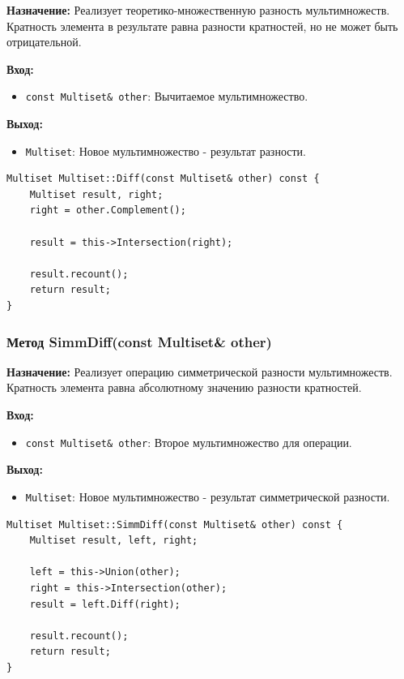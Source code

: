 \textbf{Назначение:} Реализует теоретико-множественную разность мультимножеств. Кратность элемента в результате равна разности кратностей, но не может быть отрицательной.

\textbf{Вход:}
\begin{itemize}
    \item \texttt{const Multiset\& other}: Вычитаемое мультимножество.
\end{itemize}

\textbf{Выход:}
\begin{itemize}
    \item \texttt{Multiset}: Новое мультимножество - результат разности.
\end{itemize}

\begin{lstlisting}[style=cstyle, caption={Реализация Diff()}]
Multiset Multiset::Diff(const Multiset& other) const {
    Multiset result, right;
	right = other.Complement();

	result = this->Intersection(right);

    result.recount();
    return result;
}
\end{lstlisting}

\subsubsection{Метод SimmDiff(const Multiset\& other)}

\textbf{Назначение:} Реализует операцию симметрической разности мультимножеств. Кратность элемента равна абсолютному значению разности кратностей.

\textbf{Вход:}
\begin{itemize}
    \item \texttt{const Multiset\& other}: Второе мультимножество для операции.
\end{itemize}

\textbf{Выход:}
\begin{itemize}
    \item \texttt{Multiset}: Новое мультимножество - результат симметрической разности.
\end{itemize}

\begin{lstlisting}[style=cstyle, caption={Реализация SimmDiff()}]
Multiset Multiset::SimmDiff(const Multiset& other) const {
    Multiset result, left, right;

	left = this->Union(other);
	right = this->Intersection(other);
	result = left.Diff(right);

	result.recount();
	return result;
}
\end{lstlisting}

